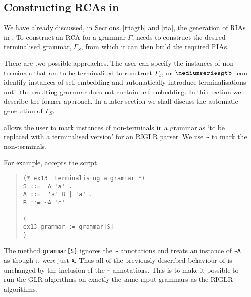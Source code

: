 \subsection{Constructing RCAs in \gtbs}\label{rcagtb}

We have already discussed, in Sections~\ref{iriagtb} and \ref{ria}, 
the generation of RIAs in \gtbs. To construct an RCA for a grammar
$\Gamma$, \gtb needs to construct the desired terminalised grammar,
$\Gamma_S$, from which it can then build the required RIAs.

There are two possible approaches. The user can specify the instances
of non-terminals that are to be terminalised to construct $\Gamma_S$,
or $\gtb$ can identify instances of self embedding and automatically
introduce terminalisations until the resulting grammar does not
contain self embedding. In this section we describe the former
approach. In a later section we shall discuss the automatic generation
of $\Gamma_S$.

\gtb allows the user to mark instances of non-terminals in a grammar as
`to be replaced with a terminalised version' for an RIGLR parser. We use
\verb+~+ to mark the non-terminals.

For example, \gtb accepts the script
\begin{quote}
\begin{verbatim}
(* ex13  terminalising a grammar *)
S ::=  A 'a' .
A ::=  'a' B | 'a' .
B ::= ~A 'c' .

(
ex13_grammar := grammar[S]
)
\end{verbatim}
\end{quote}

The method
\verb+grammar[S]+ ignores the \verb+~+ annotations and treats an instance
of \verb+~A+ as though it were just \verb+A+. Thus all of the
previously described behaviour of \gtb is unchanged by the inclusion
of the \verb+~+ annotations. This is to make it possible to run the GLR
algorithms on exactly the same input grammars as the RIGLR algorithms.

